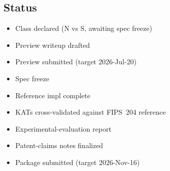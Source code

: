 \subsection{Status}

\begin{itemize}[leftmargin=*, itemsep=0pt]
\item[$\square$] Class declared (N vs S, awaiting spec freeze)
\item[$\square$] Preview writeup drafted
\item[$\square$] Preview submitted (target 2026-Jul-20)
\item[$\square$] Spec freeze
\item[$\square$] Reference impl complete
\item[$\square$] KATs cross-validated against FIPS~204 reference
\item[$\square$] Experimental-evaluation report
\item[$\square$] Patent-claims notes finalized
\item[$\square$] Package submitted (target 2026-Nov-16)
\end{itemize}
